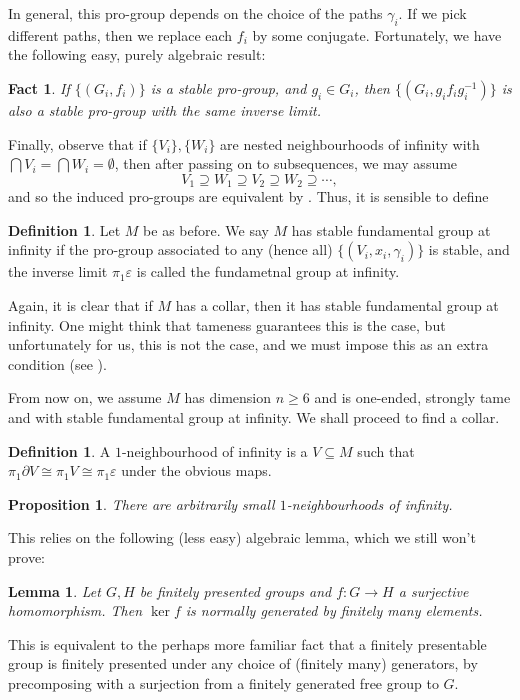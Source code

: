 \documentclass[a4paper, 12pt]{article}
\newtheorem{lemma}[thm]{Lemma}
\newtheorem{fact}[thm]{Fact}
\newtheorem{prop}[thm]{Proposition}
\theoremstyle{definition}
\newtheorem{defi}[thm]{Definition}
\newcommand\fakeqed{\pushQED{\qed}\qedhere}
\begin{document}
In general, this pro-group depends on the choice of the paths $\gamma_i$. If we pick different paths, then we replace each $f_i$ by some conjugate. Fortunately, we have the following easy, purely algebraic result:
\begin{fact}\label{fact:pro}
  If $\{(G_i, f_i)\}$ is a stable pro-group, and $g_i \in G_i$, then $\{(G_i, g_i f_i g_i^{-1})\}$ is also a stable pro-group with the same inverse limit.\fakeqed
\end{fact}

Finally, observe that if $\{V_i\}, \{W_i\}$ are nested neighbourhoods of infinity with $\bigcap V_i = \bigcap W_i = \emptyset$, then after passing on to subsequences, we may assume
\[
  V_1 \supseteq W_1 \supseteq V_2 \supseteq W_2 \supseteq \cdots,
\]
and so the induced pro-groups are equivalent by . Thus, it is sensible to define
\begin{defi}
  Let $M$ be as before. We say $M$ has stable fundamental group at infinity if the pro-group associated to any (hence all) $\{(V_i, x_i, \gamma_i)\}$ is stable, and the inverse limit $\pi_1 \varepsilon$ is called the fundametnal group at infinity.
\end{defi}

Again, it is clear that if $M$ has a collar, then it has stable fundamental group at infinity. One might think that tameness guarantees this is the case, but unfortunately for us, this is not the case, and we must impose this as an extra condition (see \cite[Example 3]{manifold-non-stable}).

From now on, we assume $M$ has dimension $n \geq 6$ and is one-ended, strongly tame and with stable fundamental group at infinity. We shall proceed to find a collar.
\begin{defi}
  A $1$-neighbourhood of infinity is a $V \subseteq M$ such that $\pi_1 \partial V \cong \pi_1 V \cong \pi_1 \varepsilon$ under the obvious maps.
\end{defi}

\begin{prop}
  There are arbitrarily small $1$-neighbourhoods of infinity.
\end{prop}
This relies on the following (less easy) algebraic lemma, which we still won't prove:
\begin{lemma}
  Let $G, H$ be finitely presented groups and $f: G \to H$ a surjective homomorphism. Then $\ker f$ is normally generated by finitely many elements.\fakeqed
\end{lemma}
This is equivalent to the perhaps more familiar fact that a finitely presentable group is finitely presented under any choice of (finitely many) generators, by precomposing with a surjection from a finitely generated free group to $G$.
\end{document}
